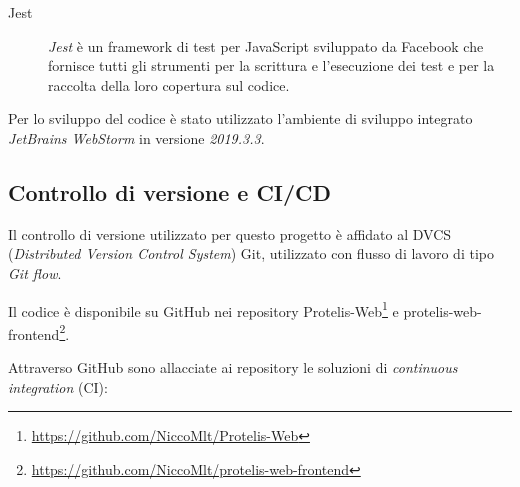 \begin{description}
        \item[Jest]
          \emph{Jest} è un framework di test per JavaScript sviluppato da Facebook che fornisce tutti gli strumenti per la scrittura e l'esecuzione dei test e per la raccolta della loro copertura sul codice.
      \end{description}

      Per lo sviluppo del codice è stato utilizzato l'ambiente di sviluppo integrato \emph{JetBrains WebStorm} in versione \emph{2019.3.3}.

  \subsection{Controllo di versione e CI/CD}
    Il controllo di versione utilizzato per questo progetto è affidato al DVCS (\emph{\emph{D}istributed \emph{V}ersion \emph{C}ontrol \emph{S}ystem}) Git, utilizzato con flusso di lavoro di tipo \emph{Git flow}.


    Il codice è disponibile su GitHub nei repository Protelis-Web\footnote{\url{https://github.com/NiccoMlt/Protelis-Web}}
    e protelis-web-frontend\footnote{\url{https://github.com/NiccoMlt/protelis-web-frontend}}.

    Attraverso GitHub sono allacciate ai repository le soluzioni di \emph{continuous integration} (CI):

